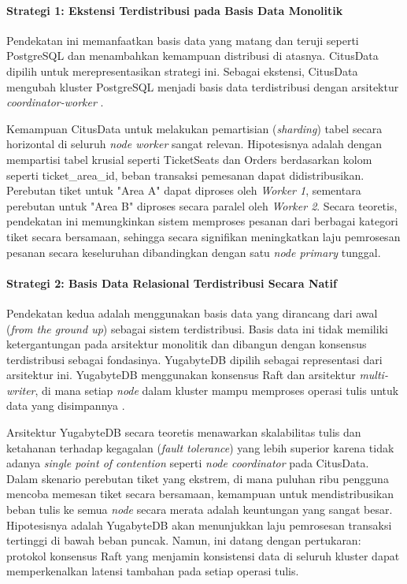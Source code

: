 \paragraph{Strategi 1: Ekstensi Terdistribusi pada Basis Data Monolitik}

Pendekatan ini memanfaatkan basis data yang matang dan teruji seperti PostgreSQL dan menambahkan kemampuan distribusi di atasnya. CitusData dipilih untuk merepresentasikan strategi ini. Sebagai ekstensi, CitusData mengubah kluster PostgreSQL menjadi basis data terdistribusi dengan arsitektur \textit{coordinator-worker} \parencite{citus}.

Kemampuan CitusData untuk melakukan pemartisian (\textit{sharding}) tabel secara horizontal di seluruh \textit{node worker} sangat relevan. Hipotesisnya adalah dengan mempartisi tabel krusial seperti TicketSeats dan Orders berdasarkan kolom seperti ticket\_area\_id, beban transaksi pemesanan dapat didistribusikan. Perebutan tiket untuk "Area A" dapat diproses oleh \textit{Worker 1}, sementara perebutan untuk "Area B" diproses secara paralel oleh \textit{Worker 2}. Secara teoretis, pendekatan ini memungkinkan sistem memproses pesanan dari berbagai kategori tiket secara bersamaan, sehingga secara signifikan meningkatkan laju pemrosesan pesanan secara keseluruhan dibandingkan dengan satu \textit{node primary} tunggal.

\paragraph{Strategi 2: Basis Data Relasional Terdistribusi Secara Natif}

Pendekatan kedua adalah menggunakan basis data yang dirancang dari awal (\textit{from the ground up}) sebagai sistem terdistribusi. Basis data ini tidak memiliki ketergantungan pada arsitektur monolitik dan dibangun dengan konsensus terdistribusi sebagai fondasinya. YugabyteDB dipilih sebagai representasi dari arsitektur ini. YugabyteDB menggunakan konsensus Raft dan arsitektur \textit{multi-writer}, di mana setiap \textit{node} dalam kluster mampu memproses operasi tulis untuk data yang disimpannya \parencite{yugabyte}.

Arsitektur YugabyteDB secara teoretis menawarkan skalabilitas tulis dan ketahanan terhadap kegagalan (\textit{fault tolerance}) yang lebih superior karena tidak adanya \textit{single point of contention} seperti \textit{node coordinator} pada CitusData. Dalam skenario perebutan tiket yang ekstrem, di mana puluhan ribu pengguna mencoba memesan tiket secara bersamaan, kemampuan untuk mendistribusikan beban tulis ke semua \textit{node} secara merata adalah keuntungan yang sangat besar. Hipotesisnya adalah YugabyteDB akan menunjukkan laju pemrosesan transaksi tertinggi di bawah beban puncak. Namun, ini datang dengan pertukaran: protokol konsensus Raft yang menjamin konsistensi data di seluruh kluster dapat memperkenalkan latensi tambahan pada setiap operasi tulis.

